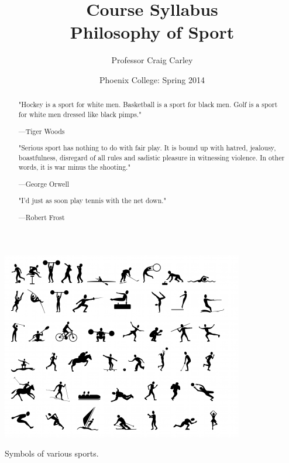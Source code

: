 \documentclass{tufte-handout}
\title{Course Syllabus\\
	Philosophy of Sport} %
\author[Craig T. Carley]{Professor Craig Carley}
\date{Phoenix College: Spring 2014} %
\begin{document}
\maketitle%



\begin{marginfigure}%
  \includegraphics[width=\linewidth]{../assets/SPORTS.jpg}
  \caption{Symbols of various sports.}
  \label{fig:marginfig}
\end{marginfigure}

\begin{abstract}
\noindent
\color{brown} "Hockey is a sport for white men. Basketball is a sport for black men. Golf is a sport for white men dressed like black pimps."
\begin{flushright}
---Tiger Woods
\end{flushright}

\noindent
"Serious sport has nothing to do with fair play. It is bound up with hatred, jealousy, boastfulness, disregard of all rules and sadistic pleasure in witnessing violence. In other words, it is war minus the shooting."
\begin{flushright}
---George Orwell
\end{flushright}

\noindent
"I'd just as soon play tennis with the net down."
\begin{flushright}
---Robert Frost
\end{flushright}

\end{abstract}
\end{document}

